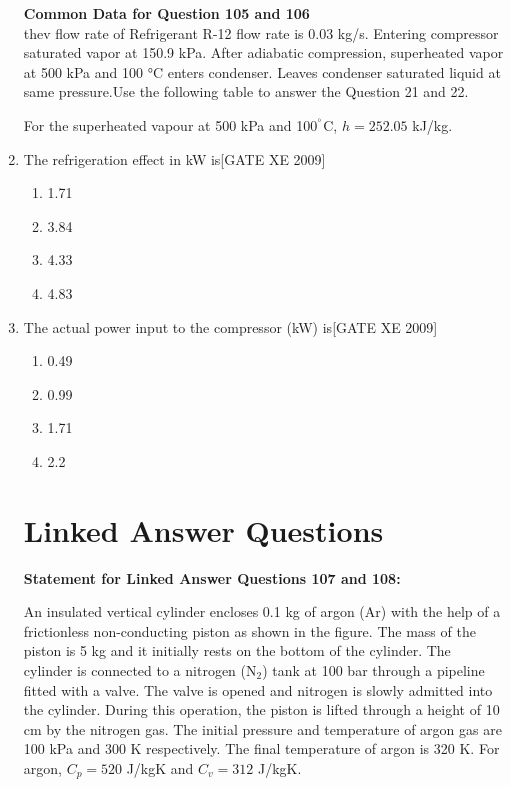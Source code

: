 \documentclass[journal,12pt,onecolumn]{IEEEtran}
\theoremstyle{remark}
\begin{document}
\begin{enumerate}
\textbf{Common Data for Question 105 and 106}\\ thev flow rate of Refrigerant R-12 flow rate is 0.03 kg/s. Entering compressor saturated vapor at 150.9 kPa. After adiabatic compression, superheated vapor at 500 kPa and 100 °C enters condenser. Leaves condenser saturated liquid at same pressure.Use the following table to answer the Question 21 and 22.


\noindent
For the superheated vapour at 500 kPa and 100$^\degree$C, $h = 252.05$ kJ/kg.

\item The refrigeration effect in kW is\hfill[GATE XE 2009]
\begin{multicols}{2}
\begin{enumerate}
    \item 1.71
    \item 3.84
    \item 4.33
    \item 4.83
\end{enumerate}
\end{multicols}



\item The actual power input to the compressor (kW) is\hfill[GATE XE 2009]
\begin{multicols}{2}
\begin{enumerate}
    \item 0.49
    \item 0.99
    \item 1.71
    \item 2.2
\end{enumerate}
\end{multicols}


\section*{Linked Answer Questions}

\textbf{Statement for Linked Answer Questions 107 and 108:}

An insulated vertical cylinder encloses 0.1 kg of argon (Ar) with the help of a frictionless non-conducting piston as shown in the figure. The mass of the piston is 5 kg and it initially rests on the bottom of the cylinder. The cylinder is connected to a nitrogen (N$_2$) tank at 100 bar through a pipeline fitted with a valve. The valve is opened and nitrogen is slowly admitted into the cylinder. During this operation, the piston is lifted through a height of 10 cm by the nitrogen gas. The initial pressure and temperature of argon gas are 100 kPa and 300 K respectively. The final temperature of argon is 320 K. For argon, $C_p = 520$ J/kgK and $C_v = 312$ J/kgK.


\end{enumerate}
\end{document}
